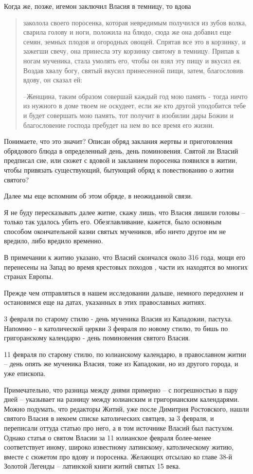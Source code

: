\documentclass[a5paper,11pt,openany]{article}
\begin{document}
Когда же, позже, игемон заключил Власия в темницу, то вдова

\begin{quotation}
\noindent заколола своего поросенка, которая невредимым получился из зубов волка, сварила голову и ноги, положила на блюдо, сюда же она добавил еще семян, земных плодов и огородных овощей. Спрятав все это в корзинку, и зажегши свечу, она принесла эту корзинку святому в темницу. Припав к ногам мученика, стала умолять его, чтобы он взял эту пищу и вкусил ея. Воздав хвалу богу, святый вкусил принесенной пищи, затем, благословив вдову, он сказал ей:

--Женщина, таким образом совершай каждый год мою память - тогда ничто из нужного в доме твоем не оскудеет, если же кто другой уподобится тебе и будет совершать мою память, тот получит в изобилии дары Божии и благословение господа пребудет на нем во все время его жизни.
\end{quotation}

 Понимаете, что это значит? Описан обряд заклания жертвы и приготовления обрядового блюда в определенный день, день поминовения. Святой ли Власий предписал сие, или сюжет с вдовой и закланием поросенка появился в житии, чтобы привязать существующий, бытующий обряд к повествованию о житии святого?

   Далее мы еще вспомним об этом обряде, в неожиданной связи.

 Я не буду пересказывать далее житие, скажу лишь, что Власия лишили головы – только так удалось убить его. Обезглавливание, кажется, было основным способом окончательной казни святых мучеников, ибо ничто другое им не вредило, либо вредило временно.

   В примечании к житию указано, что Власий скончался около 316 года, мощи его перенесены на Запад во время крестовых походов , части их находятся во многих странах Европы.

   Прежде чем отправляться в нашем исследовании дальше, немного передохнем и остановимся еще на датах, указанных в этих православных житиях.

   3 февраля по старому стилю - день мученика Власия из Кападокии, пастуха. Напомню - в католической церкви 3 февраля по новому стилю, то бишь по григоранскому календарю - день поминовения святого Власия.

  11 февраля по старому стилю, по юлианскому календарю, в православном житии – день опять же мученика Власия, тоже из Кападокии, но из другого города, и уже епископа.

 Примечательно, что разница между днями примерно – с погрешностью в пару дней – указывает на разницу между юлианским и григорианским календарями. Можно подумать, что редакторы Житий, уже после Димитрия Ростовского, нашли святого Власия в некоем списке католических святцев, за 3 февраля, и переписали оттуда статью про него, а в том источнике Власий был пастухом. Однако статья о святом Власии за 11 юлианское февраля более-менее соответствует иному, широко известному латинскому, католическому житию, вместе с сюжетом про вдову и поросенка. Желающих отсылаю ко главе 38-й Золотой Легенды – латинской книги житий святых 15 века.
\end{document}
